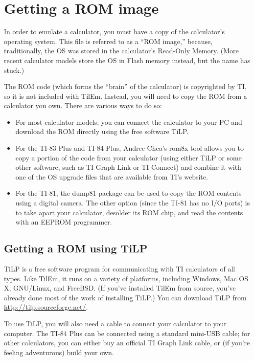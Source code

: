 \documentclass[10pt]{report}
\begin{document}
\chapter{Getting a ROM image}

In order to emulate a calculator, you must have a copy of the
calculator's operating system.  This file is referred to as a ``ROM
image,'' because, traditionally, the OS was stored in the calculator's
Read-Only Memory.  (More recent calculator models store the OS in
Flash memory instead, but the name has stuck.)

The ROM code (which forms the ``brain'' of the calculator) is
copyrighted by TI, so it is not included with TilEm.  Instead, you
will need to copy the ROM from a calculator you own.  There are
various ways to do so:

\begin{itemize}
\item For most calculator models, you can connect the calculator to
  your PC and download the ROM directly using the free software TiLP\@.

\item For the TI-83 Plus and TI-84 Plus, Andree Chea's \textsf{rom8x}
  tool allows you to copy a portion of the code from your calculator
  (using either TiLP or some other software, such as TI Graph Link or
  TI-Connect) and combine it with one of the OS upgrade files that are
  available from TI's website.

\item For the TI-81, the \textsf{dump81} package can be used to copy
  the ROM contents using a digital camera.  The other option (since
  the TI-81 has no I/O ports) is to take apart your calculator,
  desolder its ROM chip, and read the contents with an EEPROM
  programmer.
\end{itemize}

\section{Getting a ROM using TiLP}
TiLP is a free software program for communicating with TI calculators
of all types.  Like TilEm, it runs on a variety of platforms,
including Windows, Mac OS X, GNU/Linux, and FreeBSD\@.  (If you've
installed TilEm from source, you've already done most of the work of
installing TiLP\@.)  You can download TiLP from
\url{http://tilp.sourceforge.net/}.

To use TiLP, you will also need a cable to connect your calculator to
your computer.  The TI-84 Plus can be connected using a standard
mini-USB cable; for other calculators, you can either buy an official
TI Graph Link cable, or (if you're feeling adventurous) build your
own.
\end{document}
